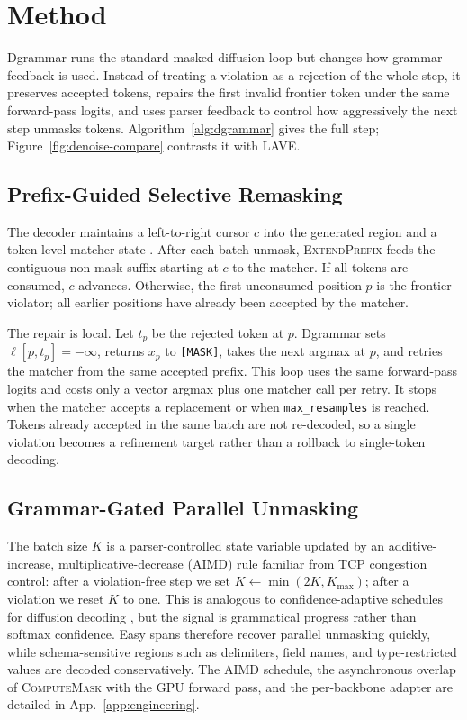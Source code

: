 \documentclass[11pt]{article}
\begin{document}
\section{Method}
\label{sec:method}

Dgrammar runs the standard masked-diffusion loop but changes how grammar feedback is used. Instead of treating a violation as a rejection of the whole step, it preserves accepted tokens, repairs the first invalid frontier token under the same forward-pass logits, and uses parser feedback to control how aggressively the next step unmasks tokens. Algorithm~\ref{alg:dgrammar} gives the full step; Figure~\ref{fig:denoise-compare} contrasts it with LAVE.

\subsection{Prefix-Guided Selective Remasking}

The decoder maintains a left-to-right cursor $c$ into the generated region and a token-level matcher state \citep{llguidance}. After each batch unmask, \textsc{ExtendPrefix} feeds the contiguous non-mask suffix starting at $c$ to the matcher. If all tokens are consumed, $c$ advances. Otherwise, the first unconsumed position $p$ is the frontier violator; all earlier positions have already been accepted by the matcher.

The repair is local. Let $t_p$ be the rejected token at $p$. Dgrammar sets $\ell[p,t_p]=-\infty$, returns $x_p$ to \texttt{[MASK]}, takes the next argmax at $p$, and retries the matcher from the same accepted prefix. This loop uses the same forward-pass logits and costs only a vector argmax plus one matcher call per retry. It stops when the matcher accepts a replacement or when \texttt{max\_resamples} is reached. Tokens already accepted in the same batch are not re-decoded, so a single violation becomes a refinement target rather than a rollback to single-token decoding.

\subsection{Grammar-Gated Parallel Unmasking}

The batch size $K$ is a parser-controlled state variable updated by an additive-increase, multiplicative-decrease (AIMD) rule familiar from TCP congestion control: after a violation-free step we set $K\leftarrow \min(2K,K_{\max})$; after a violation we reset $K$ to one. This is analogous to confidence-adaptive schedules for diffusion decoding \citep{fastdllm2025}, but the signal is grammatical progress rather than softmax confidence. Easy spans therefore recover parallel unmasking quickly, while schema-sensitive regions such as delimiters, field names, and type-restricted values are decoded conservatively. The AIMD schedule, the asynchronous overlap of \textsc{ComputeMask} with the GPU forward pass, and the per-backbone adapter are detailed in App.~\ref{app:engineering}.
\end{document}
